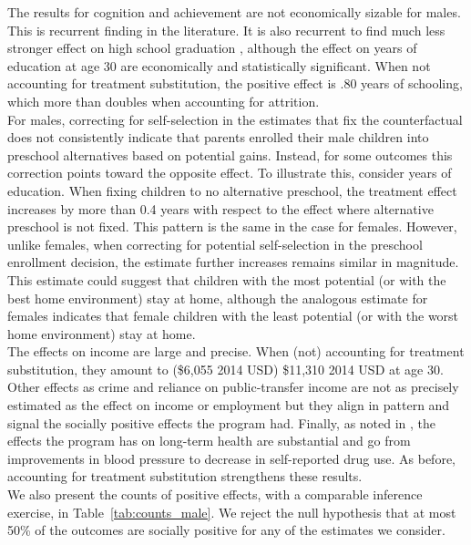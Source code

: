 \noindent The results for cognition and achievement are not economically sizable for males. This is recurrent finding in the literature. It is also recurrent to find much less stronger effect on high school graduation \citep{Elango_Hojman_etal_2015_Early-Edu}, although the effect on years of education at age 30 are economically and statistically significant. When not accounting for treatment substitution, the positive effect is .80 years of schooling, which more than doubles when accounting for attrition.\\

\noindent For males, correcting for self-selection in the estimates that fix the counterfactual does not consistently indicate that parents enrolled their male children into preschool alternatives based on potential gains. Instead, for some outcomes this correction points toward the opposite effect. To illustrate this, consider years of education. When fixing children to no alternative preschool, the treatment effect increases by more than 0.4 years with respect to the effect where alternative preschool is not fixed. This pattern is the same in the case for females. However, unlike females, when correcting for potential self-selection in the preschool enrollment decision, the estimate further increases remains similar in magnitude. This estimate could suggest that children with the most potential (or with the best home environment) stay at home, although the analogous estimate for females indicates that female children with the least potential (or with the worst home environment) stay at home.\\

\noindent The effects on income are large and precise. When (not) accounting for treatment substitution, they amount to (\$6,055 2014 USD) \$11,310 2014 USD at age 30. Other effects as crime and reliance on public-transfer income are not as precisely estimated as the effect on income or employment but they align in pattern and signal the socially positive effects the program had. Finally, as noted in \citet{Campbell_Conti_etal_2014_EarlyChildhoodInvestments}, the effects the program has on long-term health are substantial and go from improvements in blood pressure to decrease in self-reported drug use. As before, accounting for treatment substitution strengthens these results.\\

\noindent We also present the counts of positive effects, with a comparable inference exercise, in Table~\ref{tab:counts_male}. We reject the null hypothesis that at most 50\% of the outcomes are socially positive for any of the estimates we consider.

